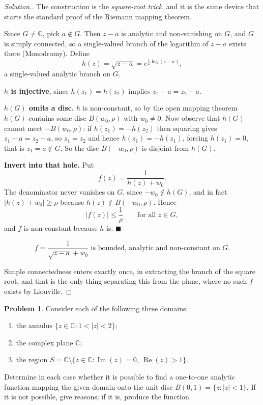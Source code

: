\documentclass[11pt,a4paper]{article}
\theoremstyle{definition}
\newtheorem{problemx}{Problem}[section]
\newenvironment{problem}{\begin{problemx}}{\end{problemx}}
\newenvironment{solution}
  {\renewcommand{\qedsymbol}{}\begin{proof}[\textit{Solution}.]}
  {\end{proof}}
\begin{document}
\begin{solution}
The construction is the \emph{square-root trick}, and it is the same device that
starts the standard proof of the Riemann mapping theorem.

Since $G \neq \mathbb{C}$, pick $a \notin G$. Then $z - a$ is analytic and
non-vanishing on $G$, and $G$ is simply connected, so a single-valued branch of
the logarithm of $z-a$ exists there (Monodromy). Define
$$h(z) = \sqrt{z-a} = e^{\frac12\log(z-a)},$$
a single-valued analytic branch on $G$.

\textbf{$h$ is injective}, since $h(z_1) = h(z_2)$ implies
$z_1 - a = z_2 - a$.

\textbf{$h(G)$ omits a disc.} $h$ is non-constant, so by the open mapping theorem
$h(G)$ contains some disc $B(w_0,\rho)$ with $w_0 \neq 0$. Now observe that
$h(G)$ cannot meet $-B(w_0,\rho)$: if $h(z_1) = -h(z_2)$ then squaring gives
$z_1 - a = z_2 - a$, so $z_1 = z_2$ and hence $h(z_1) = -h(z_1)$, forcing
$h(z_1) = 0$, that is $z_1 = a \notin G$. So the disc $B(-w_0,\rho)$ is disjoint
from $h(G)$.

\textbf{Invert into that hole.} Put
$$f(z) = \frac{1}{h(z) + w_0}.$$
The denominator never vanishes on $G$, since $-w_0 \notin h(G)$, and in fact
$\left|h(z)+w_0\right| \geq \rho$ because $h(z) \notin B(-w_0,\rho)$. Hence
$$\left|f(z)\right| \leq \frac{1}{\rho} \qquad\text{for all } z \in G ,$$
and $f$ is non-constant because $h$ is. $\blacksquare$

$$\boxed{f = \frac{1}{\sqrt{z-a}+w_0} \text{ is bounded, analytic and non-constant on } G.}$$

Simple connectedness enters exactly once, in extracting the branch of the square
root, and that is the only thing separating this from the plane, where no such $f$
exists by Liouville.
\end{solution}


\begin{problem}
Consider each of the following three domains:
\begin{enumerate}
\item[(a).] the annulus $\{z \in \mathbb{C} : 1 < \left|z\right| < 2\}$;
\item[(b).] the complex plane $\mathbb{C}$;
\item[(c).] the region
$S = \mathbb{C}\setminus\{z \in \mathbb{C} : \operatorname{Im}(z) = 0,\ \operatorname{Re}(z) > 1\}$.
\end{enumerate}
Determine in each case whether it is possible to find a one-to-one analytic
function mapping the given domain onto the unit disc
$B(0,1) = \{z : \left|z\right| < 1\}$. If it is not possible, give reasons; if it
is, produce the function.
\end{problem}
\end{document}

